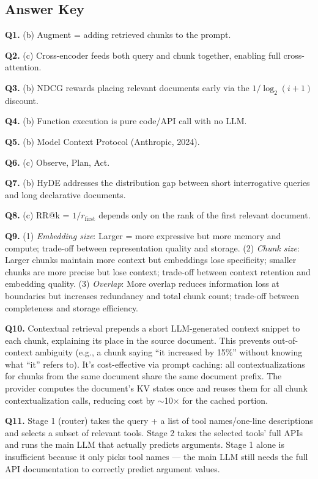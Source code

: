 \documentclass[11pt, a4paper]{article}
\begin{document}
\newpage
\subsection*{Answer Key}

\textbf{Q1.} (b) Augment = adding retrieved chunks to the prompt.

\textbf{Q2.} (c) Cross-encoder feeds both query and chunk together, enabling full cross-attention.

\textbf{Q3.} (b) NDCG rewards placing relevant documents early via the $1/\log_2(i+1)$ discount.

\textbf{Q4.} (b) Function execution is pure code/API call with no LLM.

\textbf{Q5.} (b) Model Context Protocol (Anthropic, 2024).

\textbf{Q6.} (c) Observe, Plan, Act.

\textbf{Q7.} (b) HyDE addresses the distribution gap between short interrogative queries and long declarative documents.

\textbf{Q8.} (c) RR@k = $1/r_{\text{first}}$ depends only on the rank of the first relevant document.

\textbf{Q9.} (1) \textit{Embedding size}: Larger = more expressive but more memory and compute; trade-off between representation quality and storage. (2) \textit{Chunk size}: Larger chunks maintain more context but embeddings lose specificity; smaller chunks are more precise but lose context; trade-off between context retention and embedding quality. (3) \textit{Overlap}: More overlap reduces information loss at boundaries but increases redundancy and total chunk count; trade-off between completeness and storage efficiency.

\textbf{Q10.} Contextual retrieval prepends a short LLM-generated context snippet to each chunk, explaining its place in the source document. This prevents out-of-context ambiguity (e.g., a chunk saying ``it increased by 15\%'' without knowing what ``it'' refers to). It's cost-effective via prompt caching: all contextualizations for chunks from the same document share the same document prefix. The provider computes the document's KV states once and reuses them for all chunk contextualization calls, reducing cost by $\sim$10$\times$ for the cached portion.

\textbf{Q11.} Stage 1 (router) takes the query + a list of tool names/one-line descriptions and selects a subset of relevant tools. Stage 2 takes the selected tools' full APIs and runs the main LLM that actually predicts arguments. Stage 1 alone is insufficient because it only picks tool names --- the main LLM still needs the full API documentation to correctly predict argument values.
\end{document}
